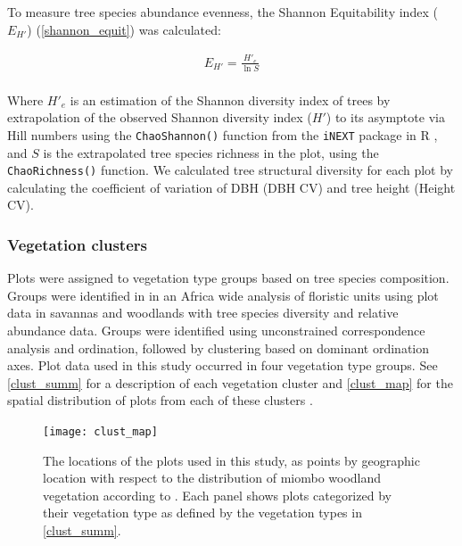 \documentclass[11pt,a4paper]{article}
\begin{document}
To measure tree species abundance evenness, the Shannon Equitability index ($E_{H'}$) \citep{Smith1996} (\autoref{shannon_equit}) was calculated: 

\begin{equation}
	\begin{gathered}
		E_{H'} = \frac{H'_{e}}{\ln{S}} \\
	\end{gathered}
	\label{shannon_equit}
\end{equation}

Where $H'_{e}$ is an estimation of the Shannon diversity index of trees by extrapolation of the observed Shannon diversity index ($H'$) to its asymptote via Hill numbers using the \verb|ChaoShannon()| function from the \verb|iNEXT| package in R \citep{Hsieh2016}, and $S$ is the extrapolated tree species richness in the plot, using the \verb|ChaoRichness()| function. We calculated tree structural diversity for each plot by calculating the coefficient of variation of DBH (DBH CV) and tree height (Height CV). 

\subsubsection{Vegetation clusters}

Plots were assigned to vegetation type groups based on tree species composition. Groups were identified in \citet{Fayolle2018} in an Africa wide analysis of floristic units using plot data in savannas and woodlands with tree species diversity and relative abundance data. Groups were identified using unconstrained correspondence analysis and ordination, followed by clustering based on dominant ordination axes. Plot data used in this study occurred in four vegetation type groups. See \autoref{clust_summ} for a description of each vegetation cluster and \autoref{clust_map} for the spatial distribution of plots from each of these clusters .

\begin{landscape}



\begin{figure}[H]
\centering
	\texttt{[image: clust\_map]}
	\caption{The locations of the \nplots{} plots used in this study, as points by geographic location with respect to the distribution of miombo woodland vegetation according to \citet{White1987}. Each panel shows plots categorized by their vegetation type as defined by the vegetation types in \autoref{clust_summ}.}
	\label{clust_map}
\end{figure}
\end{landscape}
\end{document}
